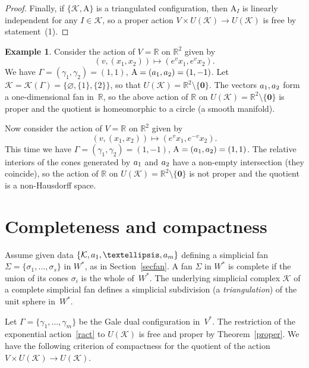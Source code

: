 \documentclass[a4paper]{amsart}
\theoremstyle{definition}
\newtheorem{example}[theorem]{Example}
\theoremstyle{remark}
\numberwithin{equation}{section}
\def\R{\mathbb R}
\def\R{\mathbb R}
\def\sK{\mathcal K}
\newcommand{\mb}[1]{{\textbf {\textit#1}}}
\newcommand{\<}{\langle}
\renewcommand{\>}{\rangle}
\begin{document}
\begin{proof}
Finally, if $\{\sK,\mathrm A\}$ is a triangulated configuration, then $\mathrm A_I$ is linearly independent for any $I\in\sK$, so a proper action $V\times U(\sK)\to U(\sK)$ is free by statement~(1).
\end{proof}

\begin{example}\label{1dimfan}
Consider the action of $V=\R$ on $\R^2$ given by 
\[
  (v,(x_1,x_2))\mapsto(e^{v}x_1,e^{v}x_2).
\]
We have $\Gamma=(\gamma_1,\gamma_2)=(1,1)$, $\mathrm A=(\mb a_1,\mb a_2)=(1,-1)$. Let $\sK=\sK(\Gamma)=\{\varnothing,\{1\},\{2\}\}$, so that $U(\sK)=\R^2\setminus\{\mathbf 0\}$.
The vectors $\mb a_1,\mb a_2$ form a one-dimensional fan in~$\R$, so the above action of $\R$ on $U(\sK)=\R^2\setminus\{\mathbf 0\}$ is proper and the quotient is homeomorphic to a circle (a smooth manifold).

Now consider the action of $V=\R$ on $\R^2$ given by 
\[
  (v,(x_1,x_2))\mapsto(e^{v}x_1,e^{-v}x_2).
\]
This time we have $\Gamma=(\gamma_1,\gamma_2)=(1,-1)$, $\mathrm A=(\mb a_1,\mb a_2)=(1,1)$.
The relative interiors of the cones generated by $\mb a_1$ and $\mb a_2$ have a non-empty intersection (they coincide), so the action of $\R$ on $U(\sK)=\R^2\setminus\{\mathbf 0\}$ is not proper and the quotient is a non-Hausdorff space.
\end{example}



\section{Completeness and compactness}\label{seccompl}
Assume given data $\{\sK,\mb a_1,\ldots,\mb a_m\}$ defining a simplicial fan 
$\Sigma=\{\sigma_1,\ldots,\sigma_s\}$ in $W^*$, as in Section~\ref{secfan}. A fan $\Sigma$ in $W^*$ is complete if the union of its cones $\sigma_i$ is the whole of~$W^*$. The underlying simplicial complex $\sK$ of a complete simplicial fan defines a simplicial subdivision (a \emph{triangulation}) of the unit sphere in~$W^*$.

Let $\Gamma=\{\gamma_1,\ldots,\gamma_m\}$ be the Gale dual configuration in~$V^*$. The restriction of the exponential action~\eqref{ract} to $U(\sK)$ is free and proper by Theorem~\ref{proper}.
We have the following criterion of compactness for the quotient of the action $V\times U(\sK)\to U(\sK)$.
\end{document}
